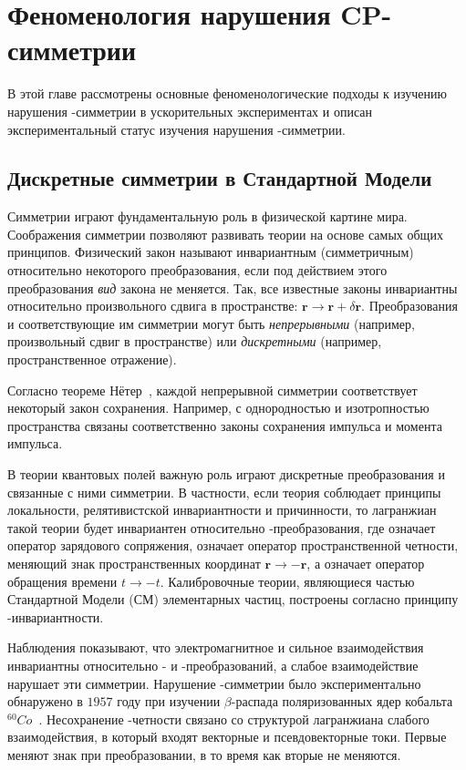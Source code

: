 \chapter{Феноменология нарушения CP-симметрии}\label{sec:phenom}
В этой главе рассмотрены основные феноменологические подходы к изучению нарушения \cpconj-симметрии в ускорительных экспериментах и описан экспериментальный статус изучения нарушения \cpconj-симметрии.%

\section{Дискретные симметрии в Стандартной Модели}\label{sec:symmetries}
Симметрии играют фундаментальную роль в физической картине мира.  Соображения симметрии позволяют развивать теории на основе самых общих принципов.  Физический закон называют инвариантным (симметричным) относительно некоторого преобразования, если под действием этого преобразования \emph{вид} закона не меняется.  Так, все известные законы инвариантны относительно произвольного сдвига в пространстве: $\mathbf{r}\to \mathbf{r} + \delta \mathbf{r}$.  Преобразования и соответствующие им симметрии могут быть \emph{непрерывными} (например, произвольный сдвиг в пространстве) или \emph{дискретными} (например, пространственное отражение).

Согласно теореме Нётер~\cite{Noether1918}, каждой непрерывной симметрии соответствует некоторый закон сохранения.  Например, с однородностью и изотропностью пространства связаны соответственно законы сохранения импульса и момента импульса.

В теории квантовых полей важную роль играют дискретные преобразования и связанные с ними симметрии.  В частности, если теория соблюдает принципы локальности, релятивистской инвариантности и причинности, то лагранжиан такой теории будет инвариантен относительно \cptconj-преобразования, где \cconj означает оператор зарядового сопряжения, \pconj означает оператор пространственной четности, меняющий знак пространственных координат $\mathbf{r}\to-\mathbf{r}$, а \tconj означает оператор обращения времени $t\to-t$.   Калибровочные теории, являющиеся частью Стандартной Модели (СМ) элементарных частиц, построены согласно принципу \cptconj-инвариантности.

Наблюдения показывают, что электромагнитное и сильное взаимодействия инвариантны относительно \pconj- и \cpconj-преобразований, а слабое взаимодействие нарушает эти симметрии.  Нарушение \pconj-симметрии было экспериментально обнаружено в $1957$ году при изучении $\beta$-распада поляризованных ядер кобальта ${}^{60}Co$~\cite{Wu}.  Несохранение \pconj-четности связано со структурой лагранжиана слабого взаимодействия, в который входят векторные и псевдовекторные токи.  Первые меняют знак при \pconj преобразовании, в то время как вторые не меняются.

